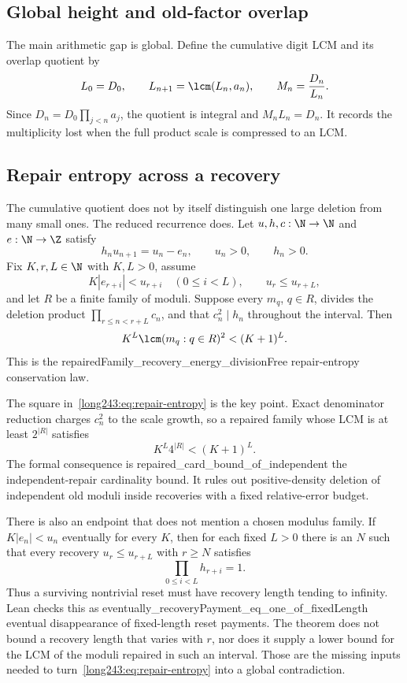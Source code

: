 \subsection{Global height and old-factor overlap}

The main arithmetic gap is global.  Define the cumulative digit LCM and its
overlap quotient by
\[
 L_0=D_0,\qquad L_{n+1}=\lcm(L_n,a_n),\qquad M_n=\frac{D_n}{L_n}.
\]
Since $D_n=D_0\prod_{j<n}a_j$, the quotient is integral and
$M_nL_n=D_n$.  It records the multiplicity lost when the full product scale
is compressed to an LCM.

\subsection{Repair entropy across a recovery}

The cumulative quotient does not by itself distinguish one large deletion
from many small ones.  The reduced recurrence does.  Let $u,h,c:\N\to\N$ and
$e:\N\to\Z$ satisfy
\[
 h_nu_{n+1}=u_n-e_n,
 \qquad u_n>0,
 \qquad h_n>0.
\]
Fix $K,r,L\in\N$ with $K,L>0$, assume
\[
 K|e_{r+i}|<u_{r+i}\quad(0\le i<L),
 \qquad u_r\le u_{r+L},
\]
and let $R$ be a finite family of moduli.  Suppose every $m_q$, $q\in R$,
divides the deletion product $\prod_{r\le n<r+L}c_n$, and that
$c_n^2\mid h_n$ throughout the interval.  Then
\begin{equation}\label{long243:eq:repair-entropy}
 K^L\lcm(m_q:q\in R)^2<(K+1)^L.
\end{equation}
This is the
      {repairedFamily_recovery_energy_divisionFree}
      {repair-entropy conservation law}.

The square in~\eqref{long243:eq:repair-entropy} is the key point.  Exact denominator
reduction charges $c_n^2$ to the scale growth, so a repaired family whose LCM
is at least $2^{|R|}$ satisfies
\[
 K^L4^{|R|}<(K+1)^L.
\]
The formal consequence is
      {repaired_card_bound_of_independent}
      {the independent-repair cardinality bound}.
It rules out positive-density deletion of independent old moduli inside
recoveries with a fixed relative-error budget.

There is also an endpoint that does not mention a chosen modulus family.  If
$K|e_n|<u_n$ eventually for every $K$, then for each fixed $L>0$ there is an
$N$ such that every recovery $u_r\le u_{r+L}$ with $r\ge N$ satisfies
\[
 \prod_{0\le i<L}h_{r+i}=1.
\]
Thus a surviving nontrivial reset must have recovery length tending to
infinity.  Lean checks this as
      {eventually_recoveryPayment_eq_one_of_fixedLength}
      {eventual disappearance of fixed-length reset payments}.
The theorem does not bound a recovery length that varies with $r$, nor does it
supply a lower bound for the LCM of the moduli repaired in such an interval.
Those are the missing inputs needed to turn~\eqref{long243:eq:repair-entropy} into a
global contradiction.

